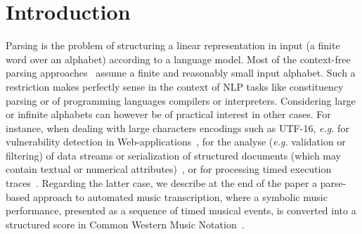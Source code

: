 \documentclass[runningheads]{llncs}
\def\eg{\textit{e.g.}\xspace}
\begin{document}
\section{Introduction} \label{sec:intro}
Parsing %
is the problem %
of structuring a linear representation in input %
(a finite word over an alphabet) according to a language model. %
%
Most of the context-free parsing approaches~\cite{GruneJacobs08parsing}  
assume a finite and reasonably small input alphabet. %
Such a restriction makes perfectly sense in the context of NLP tasks 
like constituency parsing or of programming languages compilers or interpreters.
Considering large or infinite alphabets can however be of practical interest
in other cases.
%
For instance, when dealing with large characters encodings such as UTF-16, %
\eg for vulnerability detection in Web-applications~\cite{dAntoni21CACM}, 
%
for the analyse (\eg validation or filtering) 
of data streams or serialization of structured documents 
(which may contain textual or numerical attributes)~\cite{Segoufin06csl}, 
or for processing timed execution traces~\cite{Bouyer03algebraic}.
Regarding the latter case, we describe %
at the end of the paper 
a parse-based approach to automated music transcription,
where a symbolic music performance, 
presented as a sequence of timed musical events, %
is converted into a structured score in Common Western Music Notation~\cite{foscarin:hal-01988990}.
\end{document}
